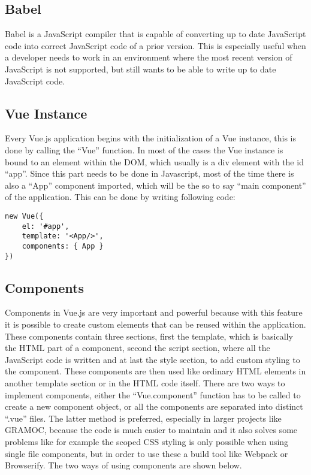\subsection{Babel}
Babel is a JavaScript compiler that is capable of converting up to date JavaScript code into correct JavaScript code of a prior version. This is especially useful when a developer needs to work in an environment where the most recent version of JavaScript is not supported, but still wants to be able to write up to date JavaScript code.

\subsection{Vue Instance}
Every Vue.js application begins with the initialization of a Vue instance, this is done by calling the ``Vue'' function. In most of the cases the Vue instance is bound to an element within the DOM, which usually is a div element with the id ``app''. Since this part needs to be done in Javascript, most of the time there is also a ``App'' component imported, which will be the so to say ``main component'' of the application. This can be done by writing following code:

\begin{minipage}{\linewidth}
\begin{lstlisting}[caption={Creating a Vue instance}, label=lst:vue-instance, captionpos=b, style=htmlcssjs]
new Vue({
    el: '#app',
    template: '<App/>',
    components: { App }
})
\end{lstlisting}
\end{minipage}

\subsection{Components}
Components in Vue.js are very important and powerful because with this feature it is possible to create custom elements that can be reused within the application. These components contain three sections, first the template, which is basically the HTML part of a component, second the script section, where all the JavaScript code is written and at last the style section, to add custom styling to the component. These components are then used like ordinary HTML elements in another template section or in the HTML code itself. There are two ways to implement components, either the ``Vue.component'' function has to be called to create a new component object, or all the components are separated into distinct ``.vue'' files. The latter method is preferred, especially in larger projects like GRAMOC, because the code is much easier to maintain and it also solves some problems like for example the scoped CSS styling is only possible when using single file components, but in order to use these a build tool like Webpack or Browserify. The two ways of using components are shown below.

